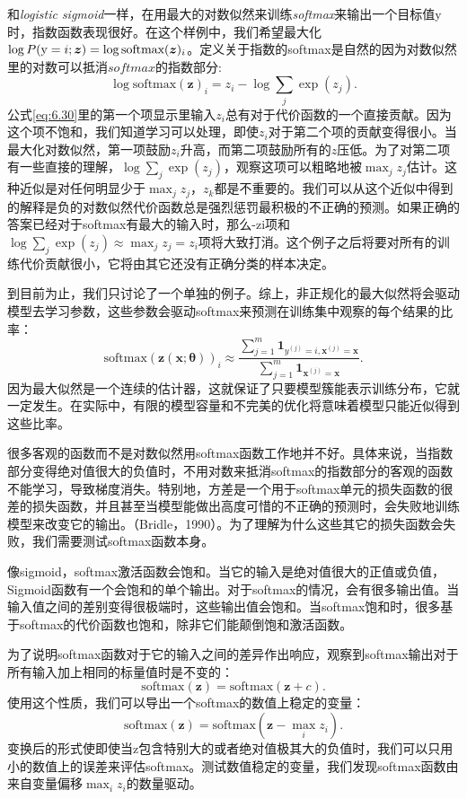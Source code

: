 和\emph{logistic sigmoid}一样，在用最大的对数似然来训练\emph{softmax}来输出一个目标值y时，指数函数表现很好。在这个样例中，我们希望最大化$\log P(\mathrm{y} =i; \bm{z})=\log \text{softmax}(\bm{z})_i$。定义关于指数的softmax是自然的因为对数似然里的对数可以抵消$softmax$的指数部分:
\begin{equation}
\log \text{softmax}(\bm{z})_i = z_i - \log \sum_j \exp(z_j).
\label{eq:6.30}
\end{equation}
公式\ref{eq:6.30}里的第一个项显示里输入$z_i$总有对于代价函数的一个直接贡献。因为这个项不饱和，我们知道学习可以处理，即使$z_i$对于第二个项的贡献变得很小。当最大化对数似然，第一项鼓励$z_i$升高，而第二项鼓励所有的$z$压低。为了对第二项有一些直接的理解，$\log\sum_j \exp(z_j)$，观察这项可以粗略地被$\max_j z_j$估计。这种近似是对任何明显少于$\max_j z_j$，$z_k$都是不重要的。我们可以从这个近似中得到的解释是负的对数似然代价函数总是强烈惩罚最积极的不正确的预测。如果正确的答案已经对于softmax有最大的输入时，那么-zi项和$\log\sum_j \exp(z_j) \approx \max_j z_j = z_i$项将大致打消。这个例子之后将要对所有的训练代价贡献很小，它将由其它还没有正确分类的样本决定。

到目前为止，我们只讨论了一个单独的例子。综上，非正规化的最大似然将会驱动模型去学习参数，这些参数会驱动softmax来预测在训练集中观察的每个结果的比率：
\begin{equation}
\text{softmax}(\bm{z}(\bm{x}; \bm{\theta}))_i \approx \frac{\sum_{j=1}^m \bm{1}_{y^{(j)}=i, \bm{x}^{(j)} = \bm{x}}  }{ \sum_{j=1}^{m} \bm{1}_{\bm{x}^{(j)} = \bm{x}} }.
\end{equation}
因为最大似然是一个连续的估计器，这就保证了只要模型簇能表示训练分布，它就一定发生。在实际中，有限的模型容量和不完美的优化将意味着模型只能近似得到这些比率。

很多客观的函数而不是对数似然用softmax函数工作地并不好。具体来说，当指数部分变得绝对值很大的负值时，不用对数来抵消softmax的指数部分的客观的函数不能学习，导致梯度消失。特别地，方差是一个用于softmax单元的损失函数的很差的损失函数，并且甚至当模型能做出高度可惜的不正确的预测时，会失败地训练模型来改变它的输出。（Bridle，1990）。为了理解为什么这些其它的损失函数会失败，我们需要测试softmax函数本身。

像sigmoid，softmax激活函数会饱和。当它的输入是绝对值很大的正值或负值，Sigmoid函数有一个会饱和的单个输出。对于softmax的情况，会有很多输出值。当输入值之间的差别变得很极端时，这些输出值会饱和。当softmax饱和时，很多基于softmax的代价函数也饱和，除非它们能颠倒饱和激活函数。

为了说明softmax函数对于它的输入之间的差异作出响应，观察到softmax输出对于所有输入加上相同的标量值时是不变的：
\begin{equation}
\text{softmax}(\bm{z}) = \text{softmax}(\bm{z}+c).
\end{equation}
使用这个性质，我们可以导出一个softmax的数值上稳定的变量：
\begin{equation}
\text{softmax}(\bm{z}) = \text{softmax}(\bm{z}- \max_i z_i).
\end{equation}
变换后的形式使即使当z包含特别大的或者绝对值极其大的负值时，我们可以只用小的数值上的误差来评估softmax。测试数值稳定的变量，我们发现softmax函数由来自变量偏移$\max_i z_i$的数量驱动。

